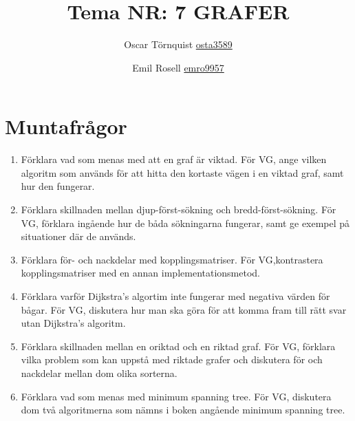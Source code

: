 \documentclass[a5paper,10pt,oneside]{article}
\title{Tema NR: 7 GRAFER}
\author{Oscar Törnquist \url{osta3589} \and Emil Rosell \url{emro9957}}
\begin{document}
\maketitle


\section*{Muntafrågor}
\begin{enumerate}
\item Förklara vad som menas med att en graf är viktad. För VG, ange vilken algoritm som används för att hitta den kortaste vägen i en viktad graf, samt hur den fungerar.
\item Förklara skillnaden mellan djup-först-sökning och bredd-först-sökning. För VG, förklara ingående hur de båda sökningarna fungerar, samt ge exempel på situationer där de används.
\item Förklara för- och nackdelar med kopplingsmatriser. För VG,kontrastera kopplingsmatriser med en annan implementationsmetod.
\item Förklara varför Dijkstra's algortim inte fungerar med negativa värden för bågar. För VG, diskutera hur man ska göra för att komma fram till rätt svar utan Dijkstra's algoritm.
\item Förklara skillnaden mellan en oriktad och en riktad graf. För VG, förklara vilka problem som kan uppstå med riktade grafer och diskutera för och nackdelar mellan dom olika sorterna.
\item Förklara vad som menas med minimum spanning tree. För VG, diskutera dom två algoritmerna som nämns i boken angående minimum spanning tree.

\end{enumerate}
\end{document}
